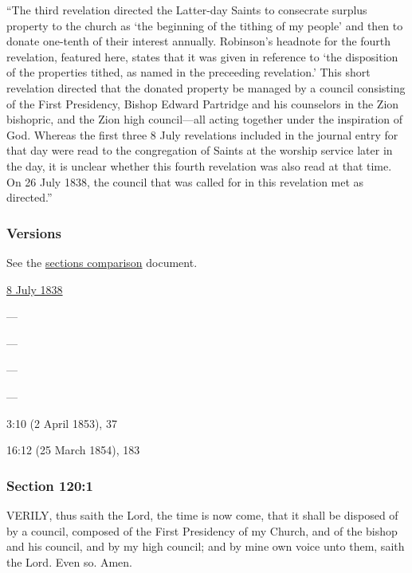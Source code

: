 			``The third revelation directed the Latter-day Saints to consecrate surplus property to the church as `the beginning of the tithing of my people' and then to donate one-tenth of their interest annually. Robinson's headnote for the fourth revelation, featured here, states that it was given in reference to `the disposition of the properties tithed, as named in the preceeding revelation.' This short revelation directed that the donated property be managed by a council consisting of the First Presidency, Bishop Edward Partridge and his counselors in the Zion bishopric, and the Zion high council---all acting together under the inspiration of God. Whereas the first three 8 July revelations included in the journal entry for that day were read to the congregation of Saints at the worship service later in the day, it is unclear whether this fourth revelation was also read at that time. On 26 July 1838, the council that was called for in this revelation met as directed.''
					
	\subsubsection{Versions}
		\label{DC120-V}
		
		See the \href{https://drive.google.com/file/d/1goAvNz8jS4R8slYfMG_db55Ty2z_vmgK/view?usp=sharing}{sections comparison} document.
	
		\begin{compactdesc}
			\item[JSP] \hyperref[EMS-1838-JS-8-JUL-1838-D]{8 July 1838}
			\item[BC] ---
			\item[DC 1835] ---
			\item[DC 1844] ---
			\item[TS] ---
			\item[DN] 3:10 (2 April 1853), 37
			\item[MS] 16:12 (25 March 1854), 183
		\end{compactdesc}

	\subsubsection{Section 120:1} %
		\label{DC120-1}

		VERILY, thus saith the Lord, the time is now come, that it shall be disposed of by a council, composed of the First Presidency of my Church, and of the bishop and his council, and by my high council; and by mine own voice unto them, saith the Lord.  Even so.  Amen.

